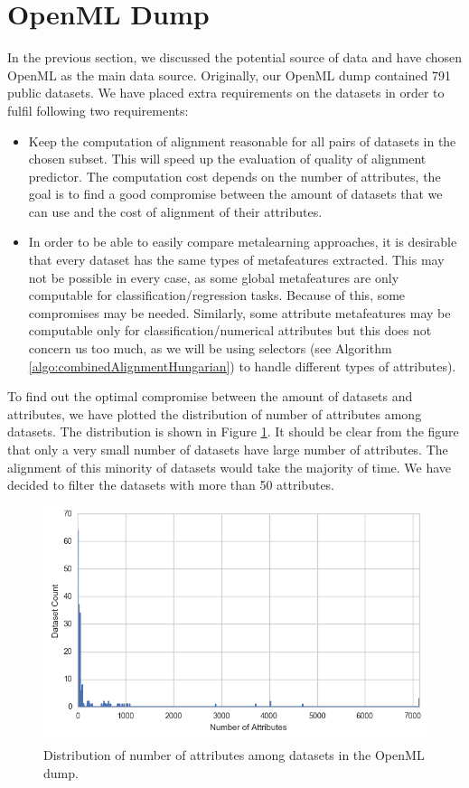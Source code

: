 \section{OpenML Dump}
\label{section:openMLDump}
In the previous section, we discussed the potential source of data and have chosen OpenML as the main data source.
Originally, our OpenML dump contained 791 public datasets. We have placed extra requirements on the datasets in order to fulfil following two requirements:
\begin{itemize}
	\item Keep the computation of alignment reasonable for all pairs of datasets in the chosen subset. This will speed up the evaluation of quality of alignment predictor. The computation cost depends on the number of attributes, the goal is to find a good compromise between the amount of datasets that we can use and the cost of alignment of their attributes.
	
	\item In order to be able to easily compare metalearning approaches, it is desirable that every dataset has the same types of metafeatures extracted. This may not be possible in every case, as some global metafeatures are only computable for classification/regression tasks. Because of this, some compromises may be needed. Similarly, some attribute metafeatures may be computable only for classification/numerical attributes but this does not concern us too much, as we will be using selectors (see Algorithm \ref{algo:combinedAlignmentHungarian}) to handle different types of attributes).
\end{itemize}
To find out the optimal compromise between the amount of datasets and attributes, we have plotted the distribution of number of attributes among datasets. The distribution is shown in Figure \ref{fig:numberOfAttributesDistribution}. It should be clear from the figure that only a very small number of datasets have large number of attributes. The alignment of this minority of datasets would take the majority of time. We have decided to filter the datasets with more than 50 attributes.

\begin{figure}
	\includegraphics[width=14cm]{Images/numberOfAttributesDistribution.png}
	\centering
	\caption{Distribution of number of attributes among datasets in the OpenML dump.}
	\label{fig:numberOfAttributesDistribution}	
\end{figure}

